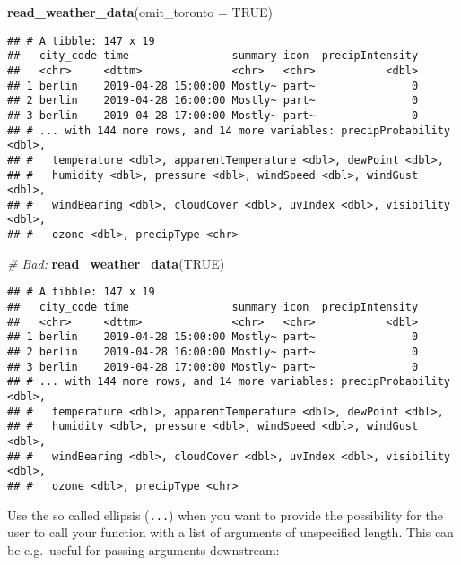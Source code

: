\documentclass[]{book}
\newenvironment{Shaded}{\begin{snugshade}}{\end{snugshade}}
\newcommand{\CommentTok}[1]{\textcolor[rgb]{0.56,0.35,0.01}{\textit{#1}}}
\newcommand{\DataTypeTok}[1]{\textcolor[rgb]{0.13,0.29,0.53}{#1}}
\newcommand{\KeywordTok}[1]{\textcolor[rgb]{0.13,0.29,0.53}{\textbf{#1}}}
\newcommand{\NormalTok}[1]{#1}
\newcommand{\OtherTok}[1]{\textcolor[rgb]{0.56,0.35,0.01}{#1}}
\begin{document}
\begin{Shaded}
\begin{Highlighting}[]
\KeywordTok{read_weather_data}\NormalTok{(}\DataTypeTok{omit_toronto =} \OtherTok{TRUE}\NormalTok{)}
\end{Highlighting}
\end{Shaded}

\begin{verbatim}
## # A tibble: 147 x 19
##   city_code time                summary icon  precipIntensity
##   <chr>     <dttm>              <chr>   <chr>           <dbl>
## 1 berlin    2019-04-28 15:00:00 Mostly~ part~               0
## 2 berlin    2019-04-28 16:00:00 Mostly~ part~               0
## 3 berlin    2019-04-28 17:00:00 Mostly~ part~               0
## # ... with 144 more rows, and 14 more variables: precipProbability <dbl>,
## #   temperature <dbl>, apparentTemperature <dbl>, dewPoint <dbl>,
## #   humidity <dbl>, pressure <dbl>, windSpeed <dbl>, windGust <dbl>,
## #   windBearing <dbl>, cloudCover <dbl>, uvIndex <dbl>, visibility <dbl>,
## #   ozone <dbl>, precipType <chr>
\end{verbatim}

\begin{Shaded}
\begin{Highlighting}[]
\CommentTok{# Bad:}
\KeywordTok{read_weather_data}\NormalTok{(}\OtherTok{TRUE}\NormalTok{)}
\end{Highlighting}
\end{Shaded}

\begin{verbatim}
## # A tibble: 147 x 19
##   city_code time                summary icon  precipIntensity
##   <chr>     <dttm>              <chr>   <chr>           <dbl>
## 1 berlin    2019-04-28 15:00:00 Mostly~ part~               0
## 2 berlin    2019-04-28 16:00:00 Mostly~ part~               0
## 3 berlin    2019-04-28 17:00:00 Mostly~ part~               0
## # ... with 144 more rows, and 14 more variables: precipProbability <dbl>,
## #   temperature <dbl>, apparentTemperature <dbl>, dewPoint <dbl>,
## #   humidity <dbl>, pressure <dbl>, windSpeed <dbl>, windGust <dbl>,
## #   windBearing <dbl>, cloudCover <dbl>, uvIndex <dbl>, visibility <dbl>,
## #   ozone <dbl>, precipType <chr>
\end{verbatim}

Use the so called ellipsis (\texttt{...}) when you want to provide the possibility for the user to call your function with a list of arguments of unspecified length.
This can be e.g.~useful for passing arguments downstream:
\end{document}
